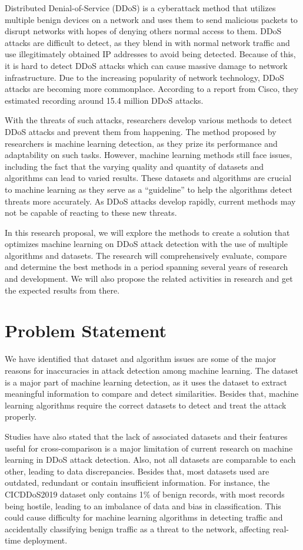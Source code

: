 \documentclass[a4paper, 12pt]{article}
\begin{document}
Distributed Denial-of-Service (DDoS) is a cyberattack method that utilizes multiple benign devices on a network and uses them to send malicious packets to disrupt networks with hopes of denying others normal access to them. DDoS attacks are difficult to detect, as they blend in with normal network traffic and use illegitimately obtained IP addresses to avoid being detected.  Because of this, it is hard to detect DDoS attacks which can cause massive damage to network infrastructure. Due to the increasing popularity of network technology, DDoS attacks are becoming more commonplace. According to a report from Cisco, they estimated recording around 15.4 million DDoS attacks.  

With the threats of such attacks, researchers develop various methods to detect DDoS attacks and prevent them from happening. The method proposed by researchers is machine learning detection, as they prize its performance and adaptability on such tasks. However, machine learning methods still face issues, including the fact that the varying quality and quantity of datasets and algorithms can lead to varied results. These datasets and algorithms are crucial to machine learning as they serve as a “guideline” to help the algorithms detect threats more accurately. As DDoS attacks develop rapidly, current methods may not be capable of reacting to these new threats. 

In this research proposal, we will explore the methods to create a solution that optimizes machine learning on DDoS attack detection with the use of multiple algorithms and datasets. The research will comprehensively evaluate, compare and determine the best methods in a period spanning several years of research and development. We will also propose the related activities in research and get the expected results from there.

\section{Problem Statement}
We have identified that dataset and algorithm issues are some of the major reasons for inaccuracies in attack detection among machine learning. The dataset is a major part of machine learning detection, as it uses the dataset to extract meaningful information to compare and detect similarities. Besides that, machine learning algorithms require the correct datasets to detect and treat the attack properly.  

Studies have also stated that the lack of associated datasets and their features useful for cross-comparison is a major limitation of current research on machine learning in DDoS attack detection.   Also, not all datasets are comparable to each other, leading to data discrepancies. Besides that, most datasets used are outdated, redundant or contain insufficient information. For instance, the CICDDoS2019 dataset only contains 1\% of benign records, with most records being hostile, leading to an imbalance of data and bias in classification.  This could cause difficulty for machine learning algorithms in detecting traffic and accidentally classifying benign traffic as a threat to the network, affecting real-time deployment.
\end{document}
